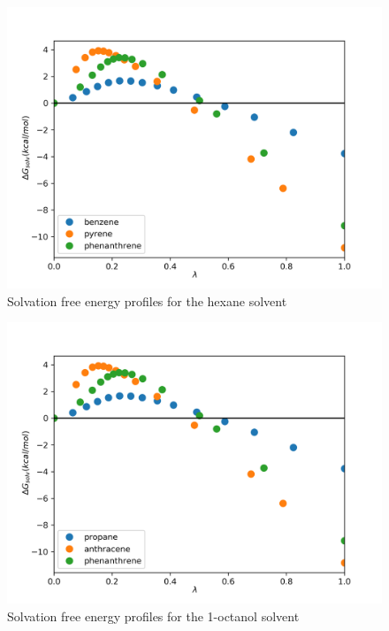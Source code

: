 \begin{figure}[H]
\centering
\includegraphics[width=0.9\linewidth]{Figures/hex}
\caption{Solvation free energy profiles for the hexane solvent}
\label{fig:hex}
\end{figure}

\begin{figure}[H]
	\centering
	\includegraphics[width=0.9\linewidth]{Figures/oct}
	\caption{Solvation free energy profiles for the 1-octanol solvent}
	\label{fig:oct}
\end{figure}


